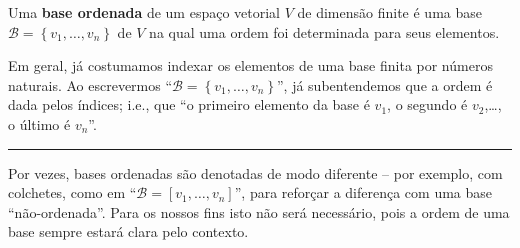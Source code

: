 \begin{definition}
	Uma \textbf{base ordenada} de um espaço vetorial $V$ de dimensão finite é uma base $\mathcal{B}=\left\{v_1,\ldots,v_n\right\}$ de $V$ na qual uma ordem foi determinada para seus elementos.
	
	Em geral, já costumamos indexar os elementos de uma base finita por números naturais. Ao escrevermos ``$\mathcal{B}=\left\{v_1,\ldots,v_n\right\}$'', já subentendemos que a ordem é dada pelos índices; i.e., que ``o primeiro elemento da base é $v_1$, o segundo é $v_2$,\ldots, o último é $v_n$''.
	
	\hrule
	
	Por vezes, bases ordenadas são denotadas de modo diferente -- por exemplo, com colchetes, como em ``$\mathcal{B}=[v_1,\ldots,v_n]$'', para reforçar a diferença com uma base ``não-ordenada''. Para os nossos fins isto não será necessário, pois a ordem de uma base sempre estará clara pelo contexto.
\end{definition}